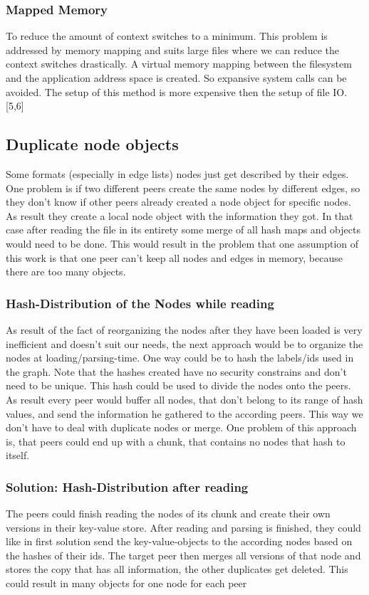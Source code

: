 \subsubsection{Mapped Memory}
To reduce the amount of context switches to a minimum. This problem is addressed by memory mapping and suits large files where we can reduce the context switches drastically. A virtual memory mapping between the filesystem and the application address space is created. So expansive system calls can be avoided. The setup of this method is more expensive then the setup of file IO. [5,6]\pageref{sec:FileReading}

\subsection{Duplicate node objects}
Some formats (especially in edge lists) nodes just get described by their edges. One problem is if two different peers create the same nodes by different edges, so they don’t know if other peers already created a node object for specific nodes. As result they create a local node object with the information they got. In that case after reading the file in its entirety some merge of all hash maps and objects would need to be done. This would result in the problem that one assumption of this work is that one peer can’t keep all nodes and edges in memory, because there are too many objects.
 
\subsubsection{Hash-Distribution of the Nodes while reading}
As result of the fact of reorganizing the nodes after they have been loaded is very inefficient and doesn’t suit our needs, the next approach would be to organize the nodes at loading/parsing-time.
One way could be to hash the labels/ids used in the graph. Note that the hashes created have no security constrains and don’t need to be unique. This hash could be used to divide the nodes onto the peers. As result every peer would buffer all nodes, that don’t belong to its range of hash values, and send the information he gathered to the according peers. This way we don’t have to deal with duplicate nodes or merge. One problem of this approach is, that peers could end up with a chunk, that contains no nodes that hash to itself.

\subsubsection{Solution: Hash-Distribution after reading}
The peers could finish reading the nodes of its chunk and create their own versions in their key-value store. After reading and parsing is finished, they could like in first solution send the key-value-objects to the according nodes based on the hashes of their ids. The target peer then merges all versions of that node and stores the copy that has all information, the other duplicates get deleted. This could result in many objects for one node for each peer

